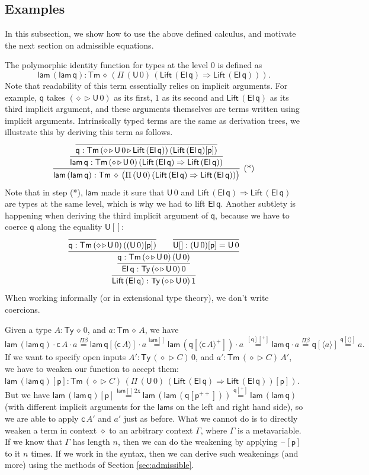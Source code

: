\documentclass[a4paper,UKenglish]{article}
\newcommand{\Ra}{\Rightarrow}
\newcommand{\Ty}{\mathsf{Ty}}
\newcommand{\Tm}{\mathsf{Tm}}
\newcommand{\p}{\mathsf{p}}
\newcommand{\q}{\mathsf{q}}
\newcommand{\ext}{\mathop{\triangleright}}
\newcommand{\lam}{\mathsf{lam}}
\newcommand{\U}{\mathsf{U}}
\newcommand{\El}{\mathsf{El}}
\newcommand{\cd}{\mathsf{c}}
\newcommand{\blank}{\mathord{\hspace{1pt}\text{--}\hspace{1pt}}} %
\newcommand{\Lift}{\mathsf{Lift}}
\begin{document}
\subsection{Examples}\label{sec:examples}

In this subsection, we show how to use the above defined calculus, and
motivate the next section on admissible equations.

The polymorphic identity function for types at the level 0 is defined
as
\[
\lam\,(\lam\,\q) : \Tm\,\diamond\,(\Pi\,(\U\,0)\,(\Lift\,(\El\,\q)\Ra\Lift\,(\El\,\q))).
\]
Note that readability of this term essentially relies on implicit
arguments. For example, $\q$ takes $(\diamond\ext\U\,0)$ as its first,
$1$ as its second and $\Lift\,(\El\,\q)$ as its third implicit
argument, and these arguments themselves are terms written using
implicit arguments. Intrinsically typed terms are the same as
derivation trees, we illustrate this by deriving this term as follows.
\[
\infer[\text{(*)}]{\lam\,(\lam\,\q) : \Tm\,\diamond\,\big(\Pi\,(\U\,0)\,(\Lift\,(\El\,\q)\Ra\Lift\,(\El\,\q))\big)}{\infer{\lam\,\q : \Tm\,(\diamond\ext\U\,0)\,(\Lift\,(\El\,\q)\Ra\Lift\,(\El\,\q))}{\infer{\q : \Tm\,(\diamond\ext\U\,0\ext\Lift\,(\El\,\q))\,(\Lift\,(\El\,\q)[\p])}{}}}
\]
Note that in step (*), $\lam$ made it sure that $\U\,0$ and
$\Lift\,(\El\,\q)\Ra\Lift\,(\El\,\q)$ are types at the same level,
which is why we had to lift $\El\,\q$. Another subtlety is
happening when deriving the third implicit argument of $\q$, because we have
to coerce $\q$ along the equality $\U[]$:
\[
\infer{\Lift\,(\El\,\q) : \Ty\,(\diamond\ext\U\,0)\,1}{\infer{\El\,\q : \Ty\,(\diamond\ext\U\,0)\,0}{\infer{\q : \Tm\,(\diamond\ext\U\,0)\,(\U\,0)}{\infer{\q : \Tm\,(\diamond\ext\U\,0)\,((\U\,0)[\p])}{} && \infer{\U[] : (\U\,0)[\p] = \U\,0}{}}}}
\]
When working informally (or in extensional type theory), we don't
write coercions.%

Given a type $A:\Ty\,\diamond\,0$, and $a : \Tm\,\diamond\,A$, we have
$
\lam\,(\lam\,\q)\cdot\cd\,A\cdot a \overset{\Pi\beta}{=}
\lam\,\q[\langle\cd\,A\rangle]\cdot a \overset{\lam[]}{=}
\lam\,(\q[\langle\cd\,A\rangle^+])\cdot a\, \overset{[\q][^+]}{=}
\lam\,\q\cdot a \overset{\Pi\beta}{=}
\q[\langle a\rangle] \overset{\q[\langle\rangle]}{=}
a.
$
If we want to specify open inputs $A':\Ty\,(\diamond\ext C)\,0$, and
$a' : \Tm\,(\diamond\ext C)\,A'$, we have to weaken our function to
accept them:
$
\lam\,(\lam\,\q)[\p] : \Tm\,(\diamond\ext C)\,(\Pi\,(\U\,0)\,(\Lift\,(\El\,\q)\Ra\Lift\,(\El\,\q))[\p]).
$
But we have
$
\lam\,(\lam\,\q)[\p] \overset{\lam[]\,2\text{x}}{=} \lam\,(\lam\,(\q[\p^{++}])) \overset{\q[^+]}{=} \lam\,(\lam\,\q)
$
(with different implicit arguments for the $\lam$s on the left and right hand side), so we are able to apply $\cd\,A'$
and $a'$ just as before. What we cannot do is to directly weaken a
term in context $\diamond$ to an arbitrary context $\Gamma$, where
$\Gamma$ is a metavariable. If we know that $\Gamma$ has length $n$,
then we can do the weakening by applying $\blank[\p]$ to it $n$ times.
If we work
in the syntax, then we can derive such weakenings (and more) using the
methods of Section \ref{sec:admissible}.
\end{document}
